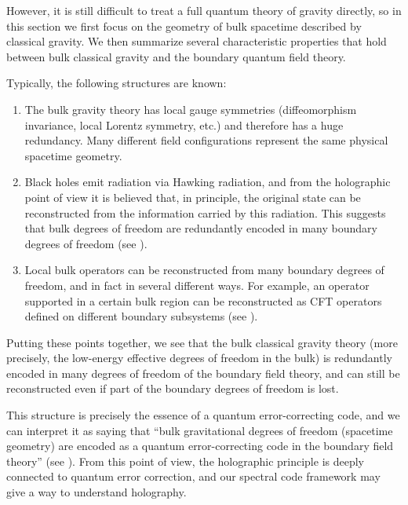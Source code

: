 \documentclass[12pt]{article}
\theoremstyle{definition} %
\theoremstyle{plain} %
\theoremstyle{remark} %
\theoremstyle{underline}
\begin{document}
However, it is still difficult to treat a full quantum theory of gravity directly, so in this section we first focus on the geometry of bulk spacetime described by classical gravity.
We then summarize several characteristic properties that hold between bulk classical gravity and the boundary quantum field theory.

Typically, the following structures are known:
\begin{enumerate}
  \item The bulk gravity theory has local gauge symmetries (diffeomorphism invariance, local Lorentz symmetry, etc.) and therefore has a huge redundancy.
        Many different field configurations represent the same physical spacetime geometry.
  \item Black holes emit radiation via Hawking radiation, and from the holographic point of view it is believed that, in principle, the original state can be reconstructed from the information carried by this radiation.
        This suggests that bulk degrees of freedom are redundantly encoded in many boundary degrees of freedom (see \cite{Hawking:1975vcx,PhysRevLett.71.3743,hayden2007black}).
  \item Local bulk operators can be reconstructed from many boundary degrees of freedom, and in fact in several different ways.
        For example, an operator supported in a certain bulk region can be reconstructed as CFT operators defined on different boundary subsystems (see \cite{hamilton2006local,almheiri2015bulk,jafferis2016relative,dong2016reconstruction,harlow2018tasi}).
\end{enumerate}

Putting these points together, we see that the bulk classical gravity theory (more precisely, the low-energy effective degrees of freedom in the bulk) is redundantly encoded in many degrees of freedom of the boundary field theory, and can still be reconstructed even if part of the boundary degrees of freedom is lost.

This structure is precisely the essence of a quantum error-correcting code, and we can interpret it as saying that
``bulk gravitational degrees of freedom (spacetime geometry) are encoded as a quantum error-correcting code in the boundary field theory'' (see \cite{pastawski2015holographic}).
From this point of view, the holographic principle is deeply connected to quantum error correction, and our spectral code framework may give a way to understand holography.
\end{document}
